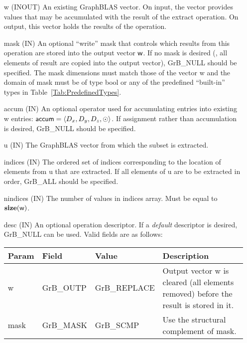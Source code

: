 \begin{itemize}[leftmargin=1in]
    \item[{\sf w}]    ({\sf INOUT}) An existing GraphBLAS vector.  On input,
    the vector provides values that may be accumulated with the result of the
    extract operation.  On output, this vector holds the results of the
    operation.

    \item[{\sf mask}]  ({\sf IN}) An optional ``write'' mask that controls which
    results from this operation are stored into the output vector
    ${\sf w}$.  If no mask is desired (\ie, all elements
    of result are copied into the output vector), {\sf GrB\_NULL}
    should be specified. The mask dimensions must match those of the
    vector {\sf w} and the domain of {\sf mask} must be
    of type {\sf bool} or any of the predefined ``built-in'' types in
    Table~\ref{Tab:PredefinedTypes}.


    \item[{\sf accum}]    ({\sf IN}) An optional operator used for accumulating
    entries into existing {\sf w} entries: ${\sf accum} = \langle D_x,
    D_y, D_z,\odot \rangle$. If assignment rather than accumulation is
    desired, {\sf GrB\_NULL} should be specified.

    \item[{\sf u}]       ({\sf IN}) The GraphBLAS vector from which the subset
    is extracted.
    
    \item[{\sf indices}]  ({\sf IN}) The ordered set of indices corresponding to the 
    location of elements from {\sf u} that are extracted.  If all elements of
    {\sf u} are to be extracted in order, {\sf GrB\_ALL} should be specified.
    
    \item[{\sf nindices}] ({\sf IN}) The number of values in {\sf indices} array.
    Must be equal to $\bold{size}({\sf w})$.

    \item[{\sf desc}]     ({\sf IN}) An optional operation descriptor.  If a 
    \emph{default} descriptor is desired, {\sf GrB\_NULL} can be used.  Valid 
    fields are as follows: \\
    
    \begin{tabular}{lllp{2.5in}}
        Param & Field  & Value & Description \\
        \hline
        {\sf w}    & {\sf GrB\_OUTP} & {\sf GrB\_REPLACE} & Output vector {\sf w}
        is cleared (all elements removed) before the result is stored in it. \\
        
        {\sf mask} & {\sf GrB\_MASK} & {\sf GrB\_SCMP}   & Use the structural 
        complement of {\sf mask}. \\
    \end{tabular}
\end{itemize}


